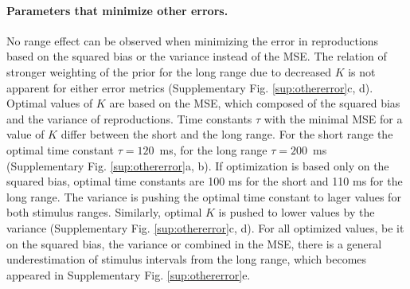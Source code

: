 \documentclass[10pt]{article}
\begin{document}
\paragraph{Parameters that minimize other errors.}
No range effect can be observed when minimizing the error in reproductions based on the squared bias or the variance instead of the MSE. The relation of stronger weighting of the prior for the long range due to decreased $K$ is not apparent for either error metrics (Supplementary Fig. \ref{sup:othererror}c, d). 
Optimal values of $K$ are based on the MSE, which composed of the squared bias and the variance of reproductions. 
Time constants $\tau$ with the minimal MSE for a value of $K$ differ between the short and the long range. For the short range the optimal time constant $\tau = 120$~ms, for the long range $\tau = 200$~ms (Supplementary Fig. \ref{sup:othererror}a, b). If optimization is based only on the squared bias, optimal time constants are 100 ms for the short and 110 ms for the long range. 
The variance is pushing the optimal time constant to lager values for both stimulus ranges. 
Similarly, optimal $K$ is pushed to lower values by the variance (Supplementary Fig. \ref{sup:othererror}c, d).
For all optimized values, be it on the squared bias, the variance or combined in the MSE, there is a general underestimation of stimulus intervals from the long range, which becomes appeared in Supplementary Fig. \ref{sup:othererror}e.
\end{document}
